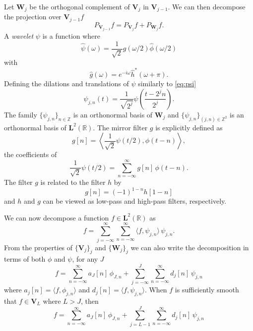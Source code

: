 \documentclass[a4paper,11pt]{article}
\begin{document}
Let $\mathbf W_j$ be the orthogonal complement of $\mathbf V_j$ in  $\mathbf V_{j-1}$. We can then decompose the projection over $\mathbf V_{j-1}f$
\begin{equation}
    P_{\mathbf V_{j-1}}f = P_{\mathbf V_j}f + P_{\mathbf W_j}f.
\end{equation}
A \emph{wavelet} $\psi$ is a function where
\begin{equation}
    \hat \psi(\omega) = \frac{1}{\sqrt 2} \hat g (\omega/2)\hat \phi (\omega/2)
\end{equation}
with
\begin{equation}
    \hat g(\omega) = e^{-i\omega} \hat h^{*}(\omega + \pi).
\end{equation}
Defining the dilations and translations of $\psi$ similarly to \eqref{eq:psi}
\begin{equation}
    \psi_{j,n}(t) = \frac{1}{\sqrt{2^j}} \psi\left(\frac{t-2^jn}{2^j}\right).
\end{equation}
The family $\{ \psi_{j,n} \}_{n\in \mathbb Z}$ is an orthonormal basis of $\mathbf W_j$ and $\{ \psi_{j,n} \}_{(j,n)\in \mathbb Z^2}$ is an orthonormal basis of $\mathbf L^2(\mathbb R)$. The mirror filter $g$ is explicitly defined as
\begin{equation}
    g[n] = \left\langle \frac{1}{\sqrt{2}} \psi(t/2), \phi(t - n) \right\rangle,
\end{equation}
the coefficients of
\begin{equation}
    \frac{1}{\sqrt{2}} \psi(t/2) = \sum_{n = -\infty}^{\infty} g[n]\,\phi(t - n).
\end{equation}
The filter $g$ is related to the filter $h$ by
\begin{equation}
    g[n] = (-1)^{1-n} h[1-n]
\end{equation}
and $h$ and $g$ can be viewed as low-pass and high-pass filters, respectively.

We can now decompose a function $f \in \mathbf L^2(\mathbb R)$ as
\begin{equation}
    f = \sum_{j = -\infty}^{\infty}\sum_{n = -\infty}^{\infty} \langle f, \psi_{j,n} \rangle\, \psi_{j,n}.
\end{equation}
From the properties of $\{\mathbf V_j\}_j$ and $\{\mathbf W_j\}_j$ we can also write the decomposition in terms of both $\phi$ and $\psi$, for any $J$
\begin{equation}
    f =
    \sum_{n = -\infty}^{\infty} a_J[n]\, \phi_{J,n} +
    \sum_{j = -\infty}^{J}\sum_{n = -\infty}^{\infty} d_j[n]\, \psi_{j,n}
\end{equation}
where $a_j[n] =  \langle f, \phi_{j,n} \rangle$ and $d_j[n] =  \langle f, \psi_{j,n} \rangle$. When $f$ is sufficiently smooth that $f\in \mathbf V_L$ where $L>J$, then
\begin{equation}
    f =
    \sum_{n = -\infty}^{\infty} a_J[n]\, \phi_{J,n} +
    \sum_{j = L - 1}^{J}\sum_{n = -\infty}^{\infty} d_j[n]\, \psi_{j,n}
\end{equation}
\end{document}

